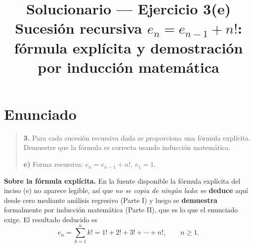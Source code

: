 \documentclass[11pt]{article}
\title{\textbf{Solucionario --- Ejercicio 3(e)}\\[4pt]\large Sucesión recursiva $e_n=e_{n-1}+n!$: fórmula explícita y demostración por inducción matemática}
\author{}
\date{}
\begin{document}
\maketitle

\section*{Enunciado}

\begin{quote}
\textbf{3.} Para cada sucesión recursiva dada se proporciona una fórmula explícita. Demuestre que la fórmula es correcta usando inducción matemática.

\medskip
\textbf{e)} Forma recursiva: $e_n = e_{n-1} + n!,\ e_1 = 1.$
\end{quote}

\begin{nota}
\textbf{Sobre la fórmula explícita.} En la fuente disponible la fórmula explícita del inciso (e) no aparece legible, así que \emph{no se copia de ningún lado}: se \textbf{deduce} aquí desde cero mediante análisis regresivo (Parte I) y luego se \textbf{demuestra} formalmente por inducción matemática (Parte II), que es lo que el enunciado exige. El resultado deducido es
\[
e_n=\sum_{k=1}^{n}k! = 1!+2!+3!+\cdots+n!,\qquad n\ge 1 .
\]
\end{nota}
\end{document}
